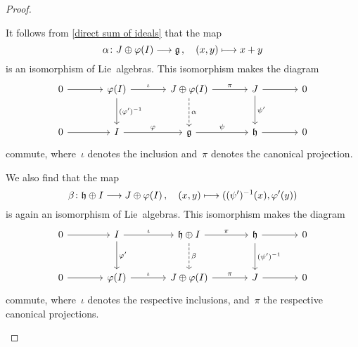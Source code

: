 \begin{proof}
\begin{implicationlist}
      It follows from \cref{direct sum of ideals} that the map
      \[
        \alpha
        \colon
        J \oplus \varphi(I)
        \to
        \glie \,,
        \quad
        (x, y)
        \mapsto
        x + y
      \]
      is an isomorphism of Lie~algebras.
      This isomorphism makes the diagram
      \[
        \begin{tikzcd}[sep = large]
          0
          \arrow{r}
          &
          \varphi(I)
          \arrow{r}[above]{\iota}
          \arrow{d}[right]{(\varphi')^{-1}}
          &
          J \oplus \varphi(I)
          \arrow{r}[above]{\pi}
          \arrow[dashed]{d}[right]{\alpha}
          &
          J
          \arrow{r}
          \arrow{d}[right]{\psi'}
          &
          0
          \\
          0
          \arrow{r}
          &
          I
          \arrow{r}[above]{\varphi}
          &
          \glie
          \arrow{r}[above]{\psi}
          &
          \hlie
          \arrow{r}
          &
          0
        \end{tikzcd}
      \]
      commute, where~$\iota$ denotes the inclusion and~$\pi$ denotes the canonical projection.

      We also find that the map
      \[
        \beta
        \colon
        \hlie \oplus I
        \to
        J \oplus \varphi(I) \,,
        \quad
        (x,y)
        \mapsto
        ( (\psi')^{-1}(x) , \varphi'(y) )
      \]
      is again an isomorphism of Lie~algebras.
      This isomorphism makes the diagram
      \[
        \begin{tikzcd}[sep = large]
          0
          \arrow{r}
          &
          I
          \arrow{r}[above]{\iota}
          \arrow{d}[right]{\varphi'}
          &
          \hlie \oplus I
          \arrow{r}[above]{\pi}
          \arrow[dashed]{d}[right]{\beta}
          &
          \hlie
          \arrow{r}
          \arrow{d}[right]{(\psi')^{-1}}
          &
          0
          \\
          0
          \arrow{r}
          &
          \varphi(I)
          \arrow{r}[above]{\iota}
          &
          J \oplus \varphi(I)
          \arrow{r}[above]{\pi}
          &
          J
          \arrow{r}
          &
          0
        \end{tikzcd}
      \]
      commute, where~$\iota$ denotes the respective inclusions, and~$\pi$ the respective canonical projections.


\end{implicationlist}
\end{proof}
